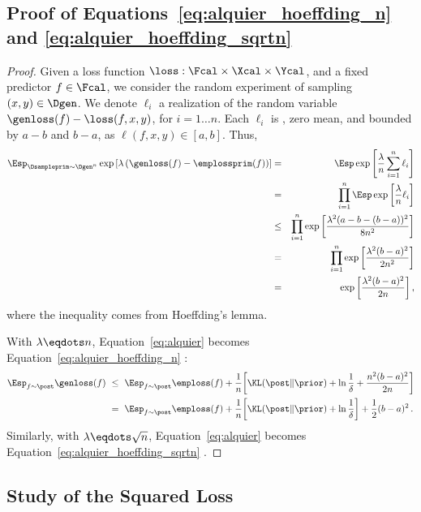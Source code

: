 \documentclass{article}
\theoremstyle{definition}
\theoremstyle{plain}
\begin{document}
\subsection{Proof of Equations~\eqref{eq:alquier_hoeffding_n} and \eqref{eq:alquier_hoeffding_sqrtn}}
%
%
%
%
%
%
%
%
%
%
%
%
%
%
%
%
%
%
%
%
%
%
%
%
%
%
%
%
%
%
%

\begin{proof}%
	Given a loss function $\loss:\Fcal\times \Xcal\times \Ycal$, and a fixed predictor $f\in\Fcal$, we consider the random experiment of sampling $(x,y)\in\Dgen$.  We denote  $\ell_i$ a realization of the random variable $\genloss(f) - \loss(f, x, y)$, for  $i = 1\ldots n$. Each $\ell_i$ is \iid,  zero mean, and bounded by $a-b$ and $b-a$, as $\ell(f, x, y) \in [a,b]$.  Thus,
	{\allowdisplaybreaks[4]
		\begin{eqnarray*}
%
			\Esp_{{\Dsampleprim\sim \Dgen^n}} 
			\exp\left[{\lambda\left(\genloss(f) - \emplossprim(f)\right)}\right]%
			&=& \Esp \exp \left[ \frac\lambda n \sum_{i=1}^n \ell_i\right]\\
			&=& \prod_{i=1}^n \Esp \exp \left[ \frac\lambda n\ell_i\right]\\
			&\leq& \prod_{i=1}^n  \exp \left[ \frac{\lambda^2(a-b-(b-a))^2}{8n^2}\right]
			\\
			&=& \prod_{i=1}^n  \exp \left[ \frac{\lambda^2(b-a)^2}{2n^2}\right]\\
			&=&  \exp \left[ \frac{\lambda^2(b-a)^2}{2n}\right],
		\end{eqnarray*}
	}%
	where the inequality comes from Hoeffding's lemma.
	
	With $\lambda\eqdots n$, Equation~\eqref{eq:alquier} becomes Equation~\eqref{eq:alquier_hoeffding_n} :
	\begin{align*} 
	\Esp_{f\sim\post} \genloss(f) 
	&\ \le \  \Esp_{f\sim\post} \emploss(f) +
	\dfrac{1}{n}\!\left[ \KL(\post\|\prior) +
	\ln\dfrac{1}{\delta} + \frac{n^2(b-a)^2}{2n}\right]\\
	&\ = \  \Esp_{f\sim\post} \emploss(f) +
	\dfrac{1}{n}\!\left[ \KL(\post\|\prior) +
	\ln\dfrac{1}{\delta} \right] + \frac12 (b-a)^2\,.%
	\end{align*}
	Similarly, with $\lambda\eqdots \sqrt n$, Equation~\eqref{eq:alquier} becomes Equation~\eqref{eq:alquier_hoeffding_sqrtn} .
\end{proof}



%
%
%
%
%
%
%
%
%
%
%
%
%
%


\subsection{Study of the Squared Loss}
\label{appendix:s}
\end{document}
